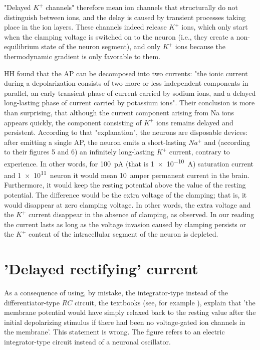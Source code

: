 "Delayed $K^+$ channels" therefore mean ion channels that structurally do not distinguish between ions, and the delay is caused by transient processes taking place in the ion layers. These channels indeed release $K^+$ ions, which only start when the clamping voltage is switched on to the neuron (i.e., they create a non-equilibrium state of the neuron segment), and only $K^+$ ions because the thermodynamic gradient is only favorable to them.

\gls{HH} found that the \gls{AP} can be decomposed into two currents:
"the ionic current during a depolarization consists of two more or less independent components in parallel, an early transient phase of current carried by sodium ions, and a delayed long-lasting phase of current carried by potassium ions".
Their conclusion is more than surprising, that although the current component arising from Na ions appears quickly, the component consisting of $K^+$ ions remains delayed and persistent. According to that "explanation", the neurons are disposable devices: after emitting a single \gls{AP}, the neuron emits a short-lasting $Na^+$ and (according to their figures 5 and 6) an infinitely long-lasting $K^+$ current, contrary to experience.
In other words, for \SI{100}{\pico\ampere} (that is \SI{1e-10}{\ampere}) saturation current and \SI{1e11}{neuron} it would mean
10~amper permanent current in the brain.
Furthermore, it would keep the resting potential above 
the value of the resting potential. The difference 
would be the extra voltage of the clamping; that is,
it would disappear at zero clamping voltage.
In other words, the extra voltage and the  $K^+$ current disappear in the absence of clamping, as observed.
%
In our reading the current lasts as long as the voltage invasion caused by clamping persists or the $K^+$ content of the intracellular segment of the neuron is depleted.


\section{'Delayed rectifying' current\label{sec:Physiology-DelayedCurrent}}

As a consequence of using, by mistake, the integrator-type instead of the differentiator-type $RC$ circuit,
the textbooks (see, for example \cite{MolecularBiology:2002}), explain that 'the membrane potential would have simply relaxed back
to the resting value after the initial depolarizing stimulus if there had been
no voltage-gated ion channels in the membrane'. This statement is wrong.
The figure refers to an electric integrator-type circuit instead of a neuronal oscillator.

